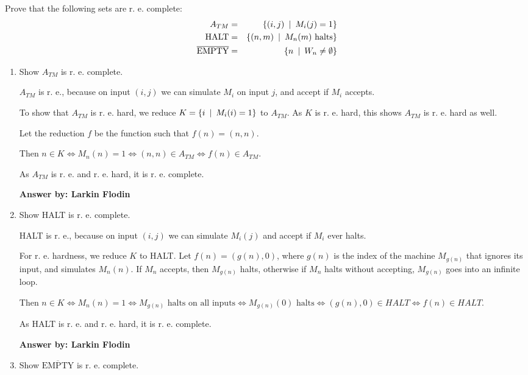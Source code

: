 \documentclass[12pt]{article}
\begin{document}
\noindent{}
\addtocounter{section}{1}

Prove that the following sets are r. e. complete:
\begin{eqnarray*}
A_{TM} &=& \{ (i, j) \enskip |  \enskip M_i(j) = 1 \} \\
\textrm{HALT} &=& \{ (n, m) \enskip | \enskip M_n(m) \textrm{ halts} \} \\
\overline{\textrm{EMPTY}} &=& \{ n \enskip | \enskip W_n \neq \emptyset \}
\end{eqnarray*}

\begin{enumerate}
\item Show $A_{TM}$ is r. e. complete.

$A_{TM}$ is r. e., because on input $(i, j)$ we can simulate $M_i$ on input $j$, and accept if $M_i$ accepts.

To show that $A_{TM}$ is r. e. hard, we reduce $K = \{ i \enskip | \enskip M_i(i) = 1 \}$ to $A_{TM}$. As $K$ is r. e. hard, this shows $A_{TM}$ is r. e. hard as well.

Let the reduction $f$ be the function such that $f(n) = (n, n)$.

Then $n \in K \iff M_n(n) = 1 \iff (n, n) \in A_{TM} \iff f(n) \in A_{TM}$.

As $A_{TM}$ is r. e. and r. e. hard, it is r. e. complete.

{\bf Answer by: Larkin Flodin} 

\item Show HALT is r. e. complete.

HALT is r. e., because on input $(i, j)$ we can simulate $M_i(j)$ and accept if $M_i$ ever halts.

For r. e. hardness, we reduce $K$ to HALT. Let $f(n) = (g(n), 0)$, where $g(n)$ is the index of the machine $M_{g(n)}$ that ignores its input, and simulates $M_n(n)$. If $M_n$ accepts, then $M_{g(n)}$ halts, otherwise if $M_n$ halts without accepting, $M_{g(n)}$ goes into an infinite loop.

Then $n \in K \iff M_n(n) = 1 \iff M_{g(n)} \textrm{ halts on all inputs} \iff M_{g(n)}(0) \textrm{ halts} \iff (g(n), 0) \in HALT \iff f(n) \in HALT$.

As HALT is r. e. and r. e. hard, it is r. e. complete.

{\bf Answer by: Larkin Flodin} 

\item Show $\overline{\textrm{EMPTY}}$ is r. e. complete.


\end{enumerate}
\end{document}
